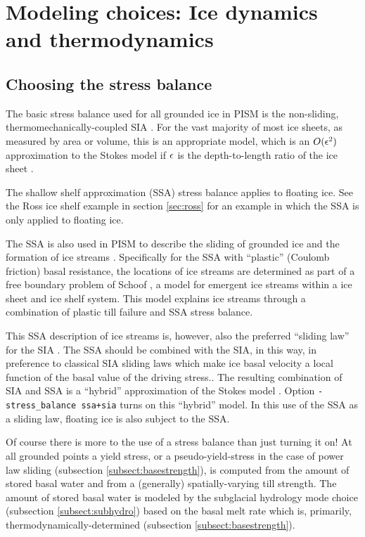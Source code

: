 
\section{Modeling choices:  Ice dynamics and thermodynamics}
\label{sec:modeling-dynamics}

\subsection{Choosing the stress balance}
\label{subsect:stressbalance}

The basic stress balance used for all grounded ice in PISM is the non-sliding, thermomechanically-coupled SIA \cite{BBL}.  For the vast majority of most ice sheets, as measured by area or volume, this is an appropriate model, which is an $O(\epsilon^2)$ approximation to the Stokes model if $\epsilon$ is the depth-to-length ratio of the ice sheet \cite{Fowler}.

The shallow shelf approximation (SSA) stress balance applies to floating ice.  See the Ross ice shelf example in section \ref{sec:ross} for an example in which the SSA is only applied to floating ice.

The SSA is also used in PISM to describe the sliding of grounded ice and the formation of ice streams \cite{BBssasliding}.  Specifically for the SSA with ``plastic'' (Coulomb friction) basal resistance, the locations of ice streams are determined as part of a free boundary problem of Schoof \cite{SchoofStream}, a model for emergent ice streams within a ice sheet and ice shelf system.  This model explains ice streams through a combination of plastic till failure and SSA stress balance.

This SSA description of ice streams is, however, also the preferred ``sliding law'' for the SIA \cite{BBssasliding,Winkelmannetal2011}.  The SSA should be combined with the SIA, in this way, in preference to classical SIA sliding laws which make ice basal velocity a local function of the basal value of the driving stress..  The resulting combination of SIA and SSA is a ``hybrid'' approximation of the Stokes model \cite{Winkelmannetal2011}.  Option \texttt{-stress_balance ssa+sia} turns on this ``hybrid'' model.  In this use of the SSA as a sliding law, floating ice is also subject to the SSA.

Of course there is more to the use of a stress balance than just turning it on!  At all grounded points a yield stress, or a pseudo-yield-stress in the case of power law sliding (subsection \ref{subsect:basestrength}), is computed from the amount of stored basal water and from a (generally) spatially-varying till strength.  The amount of stored basal water is modeled by the subglacial hydrology mode choice (subsection \ref{subsect:subhydro}) based on the basal melt rate which is, primarily, thermodynamically-determined (subsection \ref{subsect:basestrength}).


